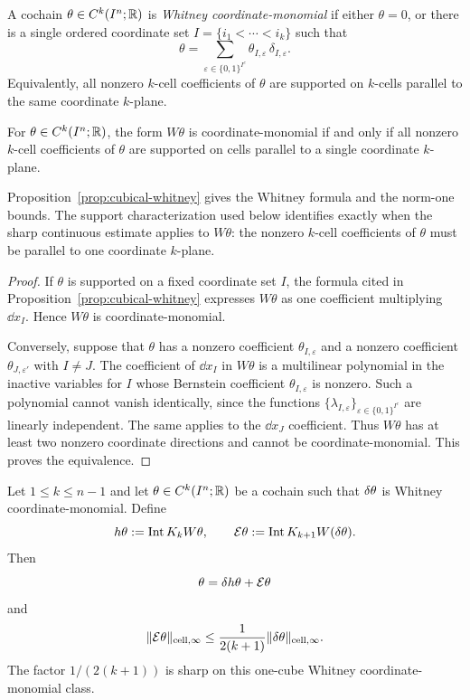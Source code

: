 \begin{definition}
\label{def:whitney-decomposable}
A cochain $\theta\in C^k(I^n;\mathbb{R})$ is \emph{Whitney coordinate-monomial} if
either $\theta=0$, or there is a single ordered coordinate set
$I=\{i_1<\cdots<i_k\}$ such that
\[
\theta=\sum_{\varepsilon\in\{0,1\}^{I^c}}
\theta_{I,\varepsilon}\,\delta_{I,\varepsilon}.
\]
Equivalently, all nonzero $k$-cell coefficients of $\theta$ are supported on
$k$-cells parallel to the same coordinate $k$-plane.
\end{definition}

\begin{proposition}
\label{prop:whitney-characterization}
For $\theta\in C^k(I^n;\mathbb{R})$, the form $W\theta$ is coordinate-monomial if
and only if all nonzero $k$-cell coefficients of $\theta$ are supported on
cells parallel to a single coordinate $k$-plane.
\end{proposition}

\begin{remark}
Proposition~\ref{prop:cubical-whitney} gives the Whitney formula and the
norm-one bounds. The support characterization used below identifies exactly
when the sharp continuous estimate applies to $W\theta$: the nonzero
$k$-cell coefficients of $\theta$ must be parallel to one coordinate
$k$-plane.
\end{remark}

\begin{proof}
If $\theta$ is supported on a fixed coordinate set $I$, the formula cited in
Proposition~\ref{prop:cubical-whitney} expresses $W\theta$ as one coefficient
multiplying $\dd x_I$. Hence $W\theta$ is coordinate-monomial.

Conversely, suppose that $\theta$ has a nonzero coefficient
$\theta_{I,\varepsilon}$ and a nonzero coefficient $\theta_{J,\varepsilon'}$
with $I\ne J$. The coefficient of $\dd x_I$ in $W\theta$ is a multilinear
polynomial in the inactive variables for $I$ whose Bernstein coefficient
$\theta_{I,\varepsilon}$ is nonzero. Such a polynomial cannot vanish
identically, since the functions
$\{\lambda_{I,\varepsilon}\}_{\varepsilon\in\{0,1\}^{I^c}}$ are linearly
independent. The same applies to the $\dd x_J$ coefficient. Thus $W\theta$
has at least two nonzero coordinate directions and cannot be
coordinate-monomial. This proves the equivalence.
\end{proof}

\begin{proposition}
\label{prop:discrete-stokes-poincare}
Let $1\le k\le n-1$ and let $\theta\in C^k(I^n;\mathbb{R})$ be a cochain such that
$\delta\theta$ is Whitney coordinate-monomial. Define
\[
h\theta:=\operatorname{Int} K_k W\theta,
\qquad
\mathcal E\theta:=\operatorname{Int} K_{k+1}W(\delta\theta).
\]
Then
\[
\theta=\delta h\theta+\mathcal E\theta
\]
and
\[
\lVert \mathcal E\theta \rVert_{\mathrm{cell},\infty}
\le
\frac{1}{2(k+1)}\lVert \delta\theta \rVert_{\mathrm{cell},\infty}.
\]
The factor $1/(2(k+1))$ is sharp on this one-cube Whitney
coordinate-monomial class.
\end{proposition}

